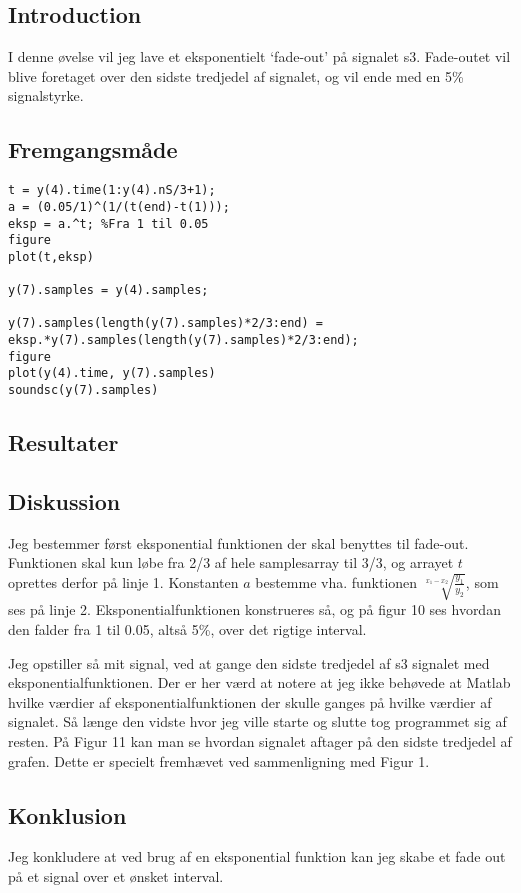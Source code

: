 \documentclass[../main.tex]{subfiles}
\begin{document}
\subsection{Introduction}

I denne øvelse vil jeg lave et eksponentielt `fade-out' på signalet s3. Fade-outet vil blive foretaget over den sidste tredjedel af signalet, og vil ende med en 5\% signalstyrke.

\subsection{Fremgangsmåde}

\begin{lstlisting}[caption={Matlab kode for øvelse 9}, label={lst:myLSTdsdsavadsa}]
t = y(4).time(1:y(4).nS/3+1);
a = (0.05/1)^(1/(t(end)-t(1)));
eksp = a.^t; %Fra 1 til 0.05
figure
plot(t,eksp)

y(7).samples = y(4).samples;

y(7).samples(length(y(7).samples)*2/3:end) = eksp.*y(7).samples(length(y(7).samples)*2/3:end);
figure
plot(y(4).time, y(7).samples)
soundsc(y(7).samples)
\end{lstlisting}

\subsection{Resultater}


\subsection{Diskussion}

Jeg bestemmer først eksponential funktionen der skal benyttes til fade-out. Funktionen skal kun løbe fra 2/3 af hele samplesarray til 3/3, og arrayet $t$ oprettes derfor på linje 1. Konstanten $a$ bestemme vha. funktionen $\sqrt[x_1-x_2]{\frac{y_1}{y_2}}$, som ses på linje 2. Eksponentialfunktionen konstrueres så, og på figur 10 ses hvordan den falder fra 1 til 0.05, altså 5\%, over det rigtige interval.

Jeg opstiller så mit signal, ved at gange den sidste tredjedel af s3 signalet med eksponentialfunktionen. Der er her værd at notere at jeg ikke behøvede at Matlab hvilke værdier af eksponentialfunktionen der skulle ganges på hvilke værdier af signalet. Så længe den vidste hvor jeg ville starte og slutte tog programmet sig af resten. På Figur 11 kan man se hvordan signalet aftager på den sidste tredjedel af grafen. Dette er specielt fremhævet ved sammenligning med Figur 1.

\subsection{Konklusion}
Jeg konkludere at ved brug af en eksponential funktion kan jeg skabe et fade out på et signal over et ønsket interval.
\end{document}
